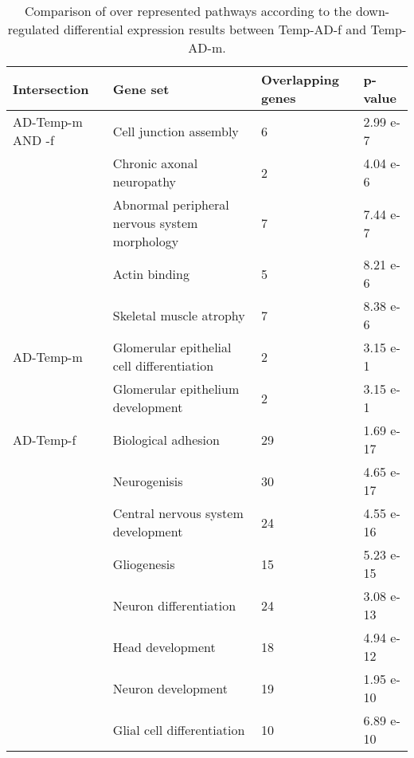 \begin{table}[!ht]
\centering
\caption{Comparison of over represented pathways according to the down-regulated differential expression results between Temp-AD-f and Temp-AD-m.}
\begin{tabularx}{11cm}{L{2cm}L{2.5cm}L{3cm}C{1.5cm}}
\toprule
\textbf{Intersection} & \textbf{Gene set} & \textbf{Overlapping genes} & \textbf{p-value} \\
\midrule
AD-Temp-m AND -f & Cell junction assembly                        & 6  & 2.99 e-7  \\
                 & Chronic axonal neuropathy                     & 2  & 4.04 e-6  \\
                 & Abnormal peripheral nervous system morphology & 7  & 7.44 e-7  \\
                 & Actin binding                                 & 5  & 8.21 e-6  \\
                 & Skeletal muscle atrophy                       & 7  & 8.38 e-6  \\
AD-Temp-m        & Glomerular epithelial cell differentiation    & 2  & 3.15 e-1  \\
                 & Glomerular epithelium development             & 2  & 3.15 e-1  \\
AD-Temp-f        & Biological adhesion                           & 29 & 1.69 e-17 \\
                 & Neurogenisis                                  & 30 & 4.65 e-17 \\
                 & Central nervous system development            & 24 & 4.55 e-16 \\
                 & Gliogenesis                                   & 15 & 5.23 e-15 \\
                 & Neuron differentiation                        & 24 & 3.08 e-13 \\
                 & Head development                              & 18 & 4.94 e-12 \\
                 & Neuron development                            & 19 & 1.95 e-10 \\
                 & Glial cell differentiation                    & 10 & 6.89 e-10\\
\bottomrule

\end{tabularx}
\end{table}


